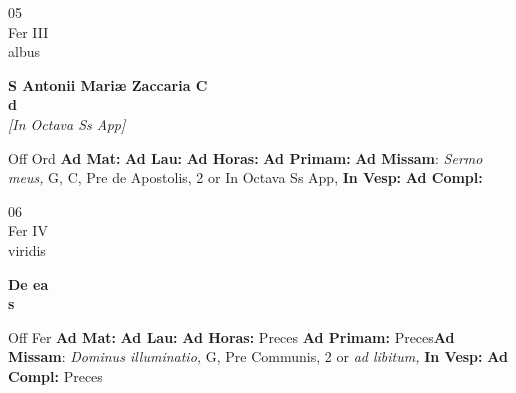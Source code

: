 \documentclass[10pt, openany]{book}
\begin{document}
    \begin{center}
        \begin{minipage}{3.5in}
            \vspace{2em}
            \begin{minipage}{0.5in}
                {\Huge 05} \\
                {\normalsize Fer III} \\
                {\normalsize albus}
            \end{minipage}
            \begin{minipage}{3.0in}
                \textbf{ \large S Antonii Mariæ Zaccaria C \\
                \textnormal{\normalsize d}} \\ \textit{[In Octava Ss App]} \\ 
            \end{minipage}
            \begin{justify}Off Ord
                \textbf{Ad Mat: }
                \textbf{Ad Lau: }
                \textbf{Ad Horas: }
                \textbf{Ad Primam: }\textbf{Ad Missam}: \textit{Sermo meus,} G, C, Pre de Apostolis, 2 or In Octava Ss App,  
                \textbf{In Vesp: }
                \textbf{Ad Compl: }
            \end{justify}
        \end{minipage}
    \end{center}

    \begin{center}
        \begin{minipage}{3.5in}
            \vspace{2em}
            \begin{minipage}{0.5in}
                {\Huge 06} \\
                {\normalsize Fer IV} \\
                {\normalsize viridis}
            \end{minipage}
            \begin{minipage}{3.0in}
                \textbf{ \large De ea \\
                \textnormal{\normalsize s}} \\ 
            \end{minipage}
            \begin{justify}Off Fer
                \textbf{Ad Mat: }
                \textbf{Ad Lau: }
                \textbf{Ad Horas: }Preces
                \textbf{Ad Primam: }Preces\textbf{Ad Missam}: \textit{Dominus illuminatio,} G, Pre Communis, 2 or \textit{ad libitum,}  
                \textbf{In Vesp: }
                \textbf{Ad Compl: }Preces
            \end{justify}
        \end{minipage}
    \end{center}
\end{document}
